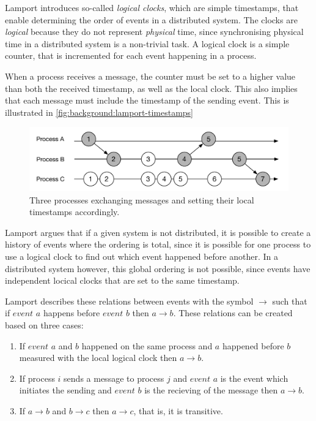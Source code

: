 		\newpar Lamport introduces so-called \textit{logical clocks}, which are simple timestamps, that enable determining the order of events in a distributed system. The clocks are \textit{logical} because they do not represent \textit{physical} time, since synchronising physical time in a distributed system is a non-trivial task. A logical clock is a simple counter, that is incremented for each event happening in a process. 
		
		When a process receives a message, the counter must be set to a higher value than both the received timestamp, as well as the local clock. This also implies that each message must include the timestamp of the sending event. This is illustrated in \autoref{fig:background:lamport-timestamps}
		
		\begin{figure}[H]
		\centering
		\includegraphics[width=\textwidth]{2background/images/lamport-timestamps.pdf}
		\caption{Three processes exchanging messages and setting their local timestamps accordingly.}
		\label{fig:background:lamport-timestamps}
		\end{figure}
		
		\newpar Lamport argues that if a given system is not distributed, it is possible to create a history of events where the ordering is total, since it is possible for one process to use a logical clock to find out which event happened before another. In a distributed system however, this global ordering is not possible, since events have independent locical clocks that are set to the same timestamp.
		
		\newpar Lamport describes these relations between events with the symbol $\rightarrow$ such that if $event$ $a$ happens before $event$ $b$ then $a \rightarrow b$. These relations can be created based on three cases:
        
        \begin{enumerate}
        	\item If $event$ $a$ and $b$ happened on the same process and $a$ happened before $b$ measured with the local logical clock then $a \rightarrow b$.
            \item If process $i$ sends a message to process $j$ and $event$ $a$ is the event which initiates the sending and $event$ $b$ is the recieving of the message then $a \rightarrow b$.
            \item If $a \rightarrow b$ and $b \rightarrow c$ then $a \rightarrow c$, that is, it is transitive.
        \end{enumerate}
        
